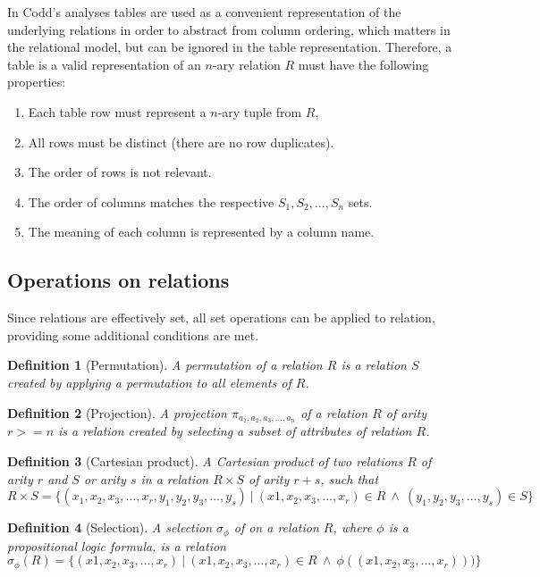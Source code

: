 \documentclass[magisterska,en]{pracamgr}
\newtheorem{defi}{Definition}[section]
\begin{document}
In Codd's analyses tables are used as a convenient representation of the underlying relations in order to abstract from column ordering, which matters in the relational model, but can be ignored in the table representation. Therefore, a table is a valid representation of an $n$-ary relation $R$ must have the following properties:
\begin{enumerate}
    \item Each table row must represent a $n$-ary tuple from $R$,
    \item All rows must be distinct (there are no row duplicates).
    \item The order of rows is not relevant.
    \item The order of columns matches the respective $S_1, S_2, \dots, S_n$ sets.
    \item The meaning of each column is represented by a column name.
\end{enumerate}

\subsection{Operations on relations}
Since relations are effectively set, all set operations can be applied to relation, providing some additional conditions are met.

\begin{defi}[Permutation]
A \emph{permutation} of a relation $R$ is a relation $S$ created by applying a permutation to all elements of $R$.
\end{defi}

\begin{defi}[Projection]
A \emph{projection} $\pi_{a_1, a_2, a_3, \dots, a_n}$ of a relation $R$ of arity $r>=n$ is a relation created by selecting a subset of attributes of relation $R$.
\end{defi}

\begin{defi}[Cartesian product]
A \emph{Cartesian product} of two relations $R$ of arity $r$ and $S$ or arity $s$ in a relation $R\times S$ of arity $r+s$, such that
$$
    R\times S = \{(x_1, x_2, x_3, \dots, x_r, y_1, y_2, y_3, \dots, y_s)\ |\ (x1, x_2, x_3, \dots, x_r) \in R\ \land\ (y_1, y_2, y_3, \dots, y_s) \in S\}
$$
\end{defi}

\begin{defi}[Selection]
A \emph{selection} $\sigma_\phi$ of on a relation $R$, where $\phi$ is a propositional logic formula, is a relation
$$
\sigma_\phi(R) = \{(x1, x_2, x_3, \dots, x_r)\ |\ (x1, x_2, x_3, \dots, x_r) \in R\ \land\ \phi((x1, x_2, x_3, \dots, x_r)))\}
$$
\end{defi}
\end{document}
